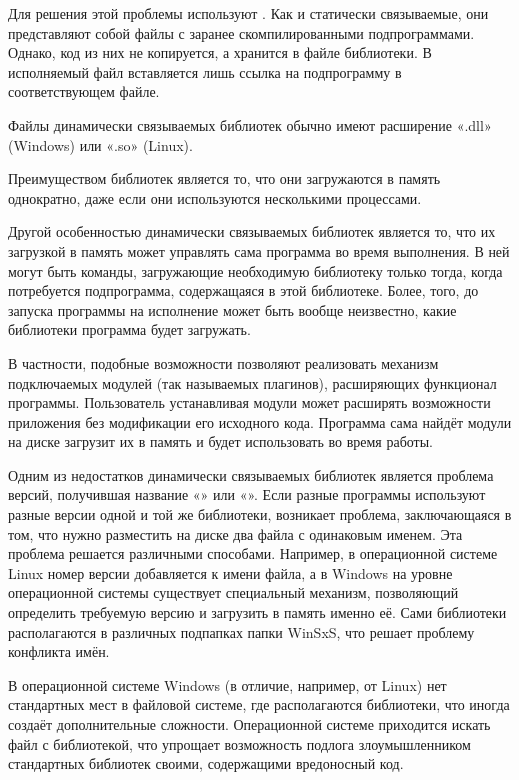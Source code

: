 Для решения этой проблемы используют .  Как и статически
связываемые, они представляют собой файлы с заранее скомпилированными
подпрограммами. Однако, код из них не копируется, а хранится в файле
библиотеки. В исполняемый файл вставляется лишь ссылка на подпрограмму
в соответствующем файле.

Файлы динамически связываемых библиотек обычно имеют расширение «.dll»
(Windows) или «.so» (Linux).

Преимуществом библиотек является то, что они загружаются в память
однократно, даже если они используются несколькими процессами.

Другой особенностью динамически связываемых библиотек является то, что
их загрузкой в память может управлять сама программа во время
выполнения. В ней могут быть команды, загружающие необходимую
библиотеку только тогда, когда потребуется подпрограмма, содержащаяся
в этой библиотеке.  Более, того, до запуска программы на исполнение
может быть вообще неизвестно, какие библиотеки программа будет
загружать.

В частности, подобные возможности позволяют реализовать механизм
подключаемых модулей (так называемых плагинов), расширяющих
функционал программы.  Пользователь устанавливая модули может
расширять возможности приложения без модификации его исходного
кода. Программа сама найдёт модули на диске загрузит их в память и
будет использовать во время работы.

Одним из недостатков динамически связываемых библиотек является
проблема версий, получившая название «» или
«». Если разные программы
используют разные версии одной и той же библиотеки, возникает
проблема, заключающаяся в том, что нужно разместить на диске два файла
с одинаковым именем. Эта проблема решается различными
способами. Например, в операционной системе Linux номер версии
добавляется к имени файла, а в Windows на уровне операционной системы
существует специальный механизм, позволяющий определить требуемую
версию и загрузить в память именно её. Сами библиотеки располагаются в
различных подпапках папки WinSxS, что решает проблему конфликта имён.

В операционной системе Windows (в отличие, например, от Linux) нет
стандартных мест в файловой системе, где располагаются библиотеки, что
иногда создаёт дополнительные сложности. Операционной системе
приходится искать файл с библиотекой, что упрощает возможность подлога
злоумышленником стандартных библиотек своими, содержащими вредоносный
код.

